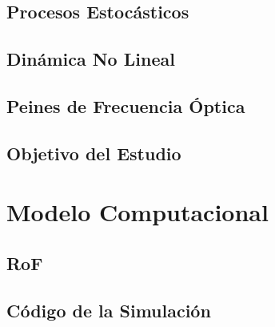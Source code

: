 \documentclass[a4paper, 11pt, oneside]{book}
\begin{document}

				\section{Procesos Estocásticos}
					\label{Intr:PrcsEstcs}
					

				\section{Dinámica No Lineal}
					\label{Intr:NonLnr}
					
%
				\section{Peines de Frecuencia Óptica}
					\label{Intr:OFC}
					
					

				\section{Objetivo del Estudio}
					\label{Intr:Obj}
					
				
			\chapter{Modelo Computacional}
				\label{Mdl}

				\section{RoF}
					\label{Mdl:RoF}
				

				\section{Código de la Simulación}
					\label{Mdl:Code}
				
\end{document}
